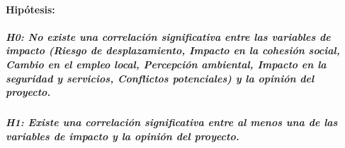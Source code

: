 \documentclass[
]{article}
\begin{document}
\paragraph{Hipótesis:}\label{hipuxf3tesis-2}

\subparagraph{H0: No existe una correlación significativa entre las
variables de impacto (Riesgo de desplazamiento, Impacto en la cohesión
social, Cambio en el empleo local, Percepción ambiental, Impacto en la
seguridad y servicios, Conflictos potenciales) y la opinión del
proyecto.}\label{h0-no-existe-una-correlaciuxf3n-significativa-entre-las-variables-de-impacto-riesgo-de-desplazamiento-impacto-en-la-cohesiuxf3n-social-cambio-en-el-empleo-local-percepciuxf3n-ambiental-impacto-en-la-seguridad-y-servicios-conflictos-potenciales-y-la-opiniuxf3n-del-proyecto.}

\subparagraph{H1: Existe una correlación significativa entre al menos
una de las variables de impacto y la opinión del
proyecto.}\label{h1-existe-una-correlaciuxf3n-significativa-entre-al-menos-una-de-las-variables-de-impacto-y-la-opiniuxf3n-del-proyecto.}
\end{document}
